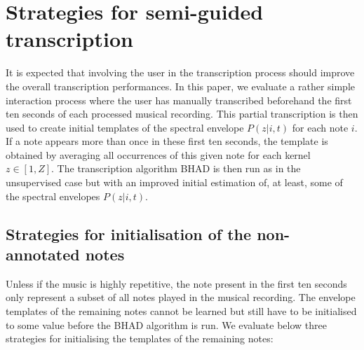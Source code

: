 \documentclass{article}
\begin{document}
\vspace{0.3cm}


\section{Strategies for semi-guided transcription}
\label{sec:semiguided}


It is expected that involving the user in the transcription process should improve the overall transcription performances. In this paper, we evaluate a rather simple interaction process where the user has manually transcribed  beforehand the first ten seconds of each processed musical recording. This partial transcription is then used to create initial templates of the spectral envelope $P(z|i,t)$ for each note $i$. If a note appears more than once in these first ten seconds, the template is obtained by averaging all occurrences of this given note for each kernel $z \in \left[1,Z\right]$. The transcription algorithm BHAD is then run as in the unsupervised case but with an improved initial estimation of, at least, some of the spectral envelopes $P(z|i,t)$.

\subsection{Strategies for initialisation of the non-annotated notes}

Unless if the music is highly repetitive, the note present in the first ten seconds only represent a subset of all notes played in the musical recording. The envelope templates of the remaining notes cannot be learned but still have to be initialised to some value before the BHAD algorithm is run. We evaluate below three strategies for initialising the templates of the remaining notes:  
\end{document}
